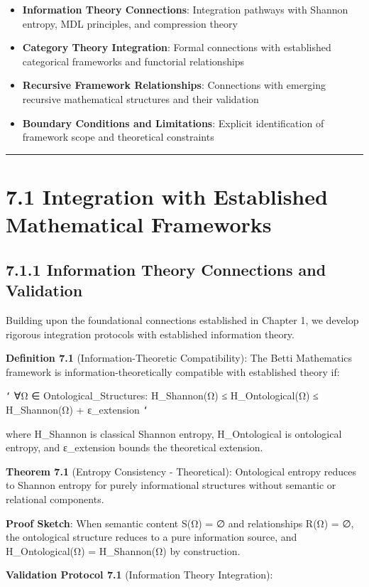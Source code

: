 \begin{itemize}
\item \textbf{Information Theory Connections}: Integration pathways with Shannon entropy, MDL principles, and compression theory
\item \textbf{Category Theory Integration}: Formal connections with established categorical frameworks and functorial relationships
\item \textbf{Recursive Framework Relationships}: Connections with emerging recursive mathematical structures and their validation
\item \textbf{Boundary Conditions and Limitations}: Explicit identification of framework scope and theoretical constraints
\end{itemize}

\hrule

\section{7.1 Integration with Established Mathematical Frameworks}

\subsection{7.1.1 Information Theory Connections and Validation}

Building upon the foundational connections established in Chapter 1, we develop rigorous integration protocols with established information theory.

\textbf{Definition 7.1} (Information-Theoretic Compatibility): The Betti Mathematics framework is information-theoretically compatible with established theory if:

\texttt{`}
∀Ω ∈ Ontological_Structures: H_Shannon(Ω) ≤ H_Ontological(Ω) ≤ H_Shannon(Ω) + ε_extension
\texttt{`}

where H_Shannon is classical Shannon entropy, H_Ontological is ontological entropy, and ε_extension bounds the theoretical extension.

\textbf{Theorem 7.1} (Entropy Consistency - Theoretical): Ontological entropy reduces to Shannon entropy for purely informational structures without semantic or relational components.

\textbf{Proof Sketch}: When semantic content S(Ω) = ∅ and relationships R(Ω) = ∅, the ontological structure reduces to a pure information source, and H_Ontological(Ω) = H_Shannon(Ω) by construction.

\textbf{Validation Protocol 7.1} (Information Theory Integration):


